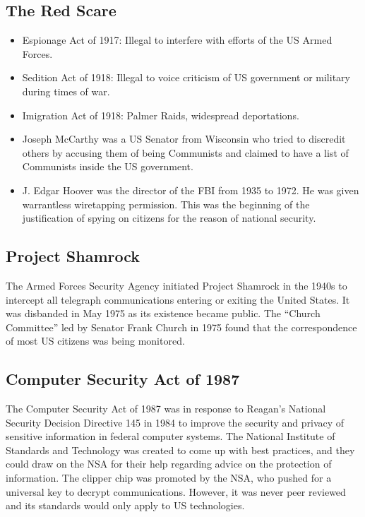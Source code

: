 \documentclass{article}
\begin{document}
\subsection*{The Red Scare}
\begin{itemize}
  \item Espionage Act of 1917: Illegal to interfere with efforts of the US
    Armed Forces.
  \item Sedition Act of 1918: Illegal to voice criticism of US government or
    military during times of war.
  \item Imigration Act of 1918: Palmer Raids, widespread deportations.
  \item Joseph McCarthy was a US Senator from Wisconsin who tried to discredit
    others by accusing them of being Communists and claimed to have a list of
    Communists inside the US government.
  \item J. Edgar Hoover was the director of the FBI from 1935 to 1972. He was
    given warrantless wiretapping permission. This was the beginning of the
    justification of spying on citizens for the reason of national security.
\end{itemize}

\subsection*{Project Shamrock}
The Armed Forces Security Agency initiated Project Shamrock in the 1940s to
intercept all telegraph communications entering or exiting the United States.
It was disbanded in May 1975 as its existence became public. The
``Church Committee'' led by Senator Frank Church in 1975 found that
the correspondence of most US citizens was being monitored.

\subsection*{Computer Security Act of 1987}
The Computer Security Act of 1987 was in response to Reagan's National Security
Decision Directive 145 in 1984 to improve the security and privacy of sensitive
information in federal computer systems. The National Institute of Standards
and Technology was created to come up with best practices, and they could draw
on the NSA for their help regarding advice on the protection of information.
The clipper chip was promoted by the NSA, who pushed for a universal key to
decrypt communications. However, it was never peer reviewed and its standards
would only apply to US technologies.
\end{document}
